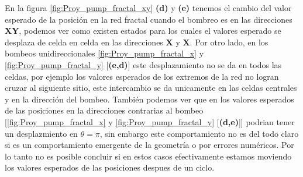 En la figura \ref{fig:Proy_pump_fractal_xy} \textbf{(d)} y \textbf{(e)} tenemos el cambio del valor esperado de la posición en la red fractal cuando el bombreo es en las direcciones \textbf{XY}, podemos ver como existen estados para los cuales el valores esperado se desplaza de celda en celda en las direcciones \textbf{X} y \textbf{X}. Por otro lado, en los bombeos unidireccionales \ref{fig:Proy_pump_fractal_x} y \ref{fig:Proy_pump_fractal_y} [\textbf{(e,d)}] este desplazamiento no se da en todos las celdas, por ejemplo los valores esperados de los extremos de la red no logran cruzar al siguiente sitio, este intercambio se da unicamente en las celdas centrales y en la dirección del bombeo. También podemos ver que en los valores esperados de las posiciones en la direcciones contrarias al bombeo  [\ref{fig:Proy_pump_fractal_x} y \ref{fig:Proy_pump_fractal_y} [\textbf{(d,e)}]] podrian tener un desplazmiento en $\theta = \pi$, sin embargo este comportamiento no es del todo claro si es un comportamiento emergente de la geometría o por errores numéricos. Por lo tanto no es posible concluir si en estos casos efectivamente estamos moviendo los valores esperados de las posiciones despues de un ciclo. 





















